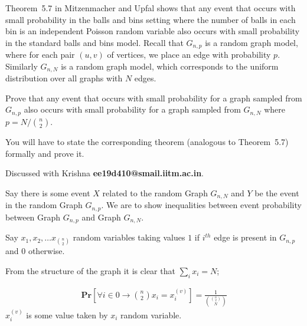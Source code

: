 \documentclass[addpoints,12pt]{exam}
\begin{document}
\begin{questions}
		
			\question[10] Theorem~5.7 in Mitzenmacher and Upfal shows that any event that occurs with small probability in the balls and bins setting where the number of balls in each bin is an independent Poisson random variable also occurs with small probability in the standard balls and bins model. Recall that $G_{n,p}$ is a random graph model, where for each pair $(u,v)$ of vertices, we place an edge with probability $p$. Similarly $G_{n,N}$ is a random graph model, which corresponds to the uniform distribution over all graphs with $N$ edges.
				
			Prove that any event that occurs with small probability for a graph sampled from $G_{n,p}$ also occurs with small probability for a graph sampled from $G_{n,N}$ where $p = N/\binom{n}{2}$.
				
			You will have to state the corresponding theorem (analogous to Theorem~5.7) formally and prove it.
			\begin{solution}
				Discussed with Krishna \textbf{ee19d410@smail.iitm.ac.in}.
    
                Say there is some event $X$ related to the random Graph $G_{n, N}$ and $Y$ be the event in the random Graph $G_{n, p}$.
                We are to show inequalities between event probability between Graph $G_{n, p}$ and Graph $G_{n, N}$.

                Say $x_1, x_2, \dots x_{\binom{n}{2}}$ random variables taking values $1$ if $i^{th}$ edge is present in $G_{n, p}$ and $0$ otherwise.

                From the structure of the graph it is clear that $\displaystyle\sum_{i} x_i = N$;

                \begin{align*}
                    \textbf{Pr}\left[\forall i \in {0 \to \binom{n}{2}} x_i = x_i^{(v)}\right] = \frac{1}{\binom{\binom{n}{2}}{N}}
                \end{align*}
                $x_i^{(v)}$ is some value taken by $x_i$ random variable.


\end{solution}
\end{questions}
\end{document}
